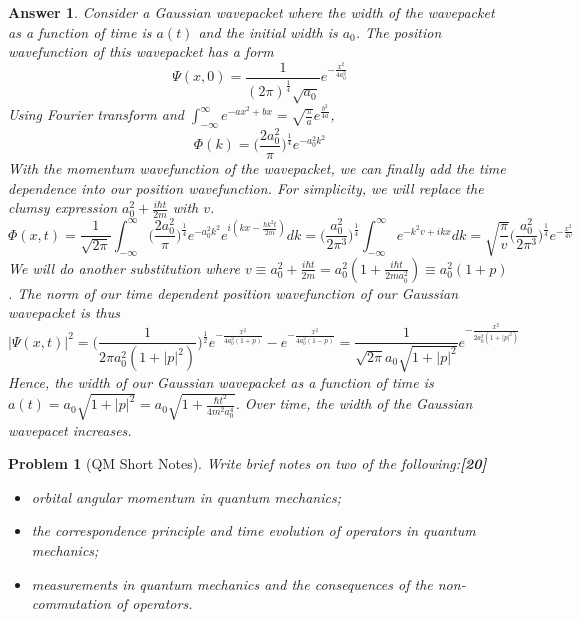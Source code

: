 \documentclass[a4paper]{article}
\newtheorem{ans}{Answer}[subsection]
\theoremstyle{new}
\newtheorem{qns}{Problem}[subsection]
\begin{document}
\begin{ans}
Consider a Gaussian wavepacket where the width of the wavepacket as a function of time is $a(t)$ and the initial width is $a_0$. The position wavefunction of this wavepacket has a form
$$\Psi(x,0)=\frac{1}{(2\pi)^{\frac{1}{4}}\sqrt{a_0}}e^{-\frac{x^2}{4a_0^2}}$$
Using Fourier transform and $\int_{-\infty}^{\infty}e^{-ax^2+bx}=\sqrt{\frac{\pi}{a}}e^{\frac{b^2}{4a}}$,
$$\Phi(k)=\bigg(\frac{2a_0^2}{\pi}\bigg)^{\frac{1}{4}}e^{-a_0^2k^2}$$
With the momentum wavefunction of the wavepacket, we can finally add the time dependence into our position wavefunction. For simplicity, we will replace the clumsy expression $a_0^2+\frac{i\hbar t}{2m}$ with $v$.
$$\Phi(x,t)=\frac{1}{\sqrt{2\pi}}\int_{-\infty}^{\infty}\bigg(\frac{2a_0^2}{\pi}\bigg)^{\frac{1}{4}}e^{-a_0^2k^2}e^{i(kx-\frac{\hbar k^2t}{2m})}dk=\bigg(\frac{a_0^2}{2\pi^3}\bigg)^{\frac{1}{4}}\int_{-\infty}^{\infty}e^{-k^2v+ikx}dk=\sqrt{\frac{\pi}{v}}\bigg(\frac{a_0^2}{2\pi^3}\bigg)^{\frac{1}{4}}e^{-\frac{x^2}{4v}}$$
We will do another substitution where $v\equiv a_0^2+\frac{i\hbar t}{2m}=a_0^2(1+\frac{i\hbar t}{2ma_0^2})\equiv a_0^2(1+p)$. The norm of our time dependent position wavefunction of our Gaussian wavepacket is thus
$$|\Psi(x,t)|^2=\bigg(\frac{1}{2\pi a_0^2(1+|p|^2)}\bigg)^{\frac{1}{2}}e^{-\frac{x^2}{4a_0^2(1+p)}}-e^{-\frac{x^2}{4a_0^2(1-p)}}=\frac{1}{\sqrt{2\pi}a_0\sqrt{1+|p|^2}}e^{-\frac{x^2}{2a_0^2(1+|p|^2)}}$$
Hence, the width of our Gaussian wavepacket as a function of time is $a(t)=a_0\sqrt{1+|p|^2}=a_0\sqrt{1+\frac{\hbar t^2}{4m^2a_0^4}}$. Over time, the width of the Gaussian wavepacet increases.
\end{ans}
\newpage
\begin{qns}[QM Short Notes]
Write brief notes on two of the following:\hfill\textbf{[20]}
\begin{itemize}
    \item orbital angular momentum in quantum mechanics;
    \item the correspondence principle and time evolution of operators in quantum mechanics;
    \item measurements in quantum mechanics and the consequences of the non-commutation of operators.
\end{itemize}
\end{qns}
\end{document}
